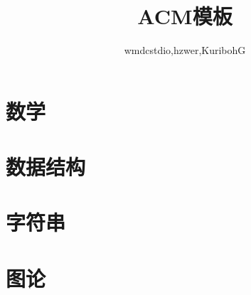 \documentclass[UTF8,a4paper]{ctexart}
\author{wmdcstdio,hzwer,KuribohG}
\title{\Huge ACM模板}
\begin{document}
 
\maketitle
\tableofcontents
\section{数学}





















\section{数据结构}














\section{字符串}













\section{图论}


\end{document}
